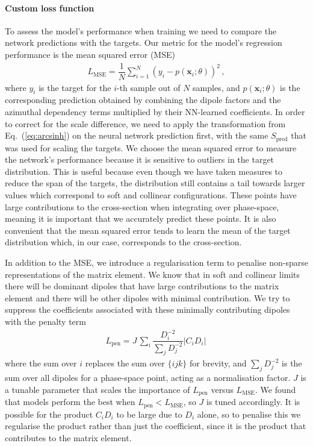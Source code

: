 \documentclass[main.tex]{subfiles}
\begin{document}
\paragraph*{Custom loss function}
To assess the model's performance when training we need to compare the network predictions with the targets. Our metric for the model's regression performance is the mean squared error (MSE)
\begin{eqnarray}\label{eq:mse}
    L_{\mathrm{MSE}} = \dfrac{1}{N} \sum_{i=1}^{N} \left(y_{i} - p(\mathbf{x}_{i}; \theta)\right)^{2} \, ,
\end{eqnarray}
where $y_{i}$ is the target for the $i$-th sample out of $N$ samples, and $p(\mathbf{x}_{i}; \theta)$ is the corresponding prediction
obtained by combining the dipole factors and the azimuthal dependency terms multiplied by their NN-learned coefficients. 
In order to correct for the scale difference, we need to apply the transformation from Eq.~(\ref{eq:arcsinh}) on the neural network prediction first, with the same $S_{\mathrm{pred}}$ that was used for scaling the targets.
We choose the mean squared error to measure the network's performance because it is sensitive to outliers in the target distribution.
This is useful because even though we have taken measures to reduce the span of the targets, the distribution still contains a tail towards larger values which correspond to soft and collinear configurations.
These points have large contributions to the cross-section when integrating over phase-space, meaning it is important that we accurately predict these points.
It is also convenient that the mean squared error tends to learn the mean of the target distribution which, in our case, corresponds to the cross-section.

In addition to the MSE, we introduce a regularisation term to penalise non-sparse representations of the matrix element. We know that in soft and collinear limits there will be dominant dipoles that have large contributions to the matrix element and there will be other dipoles with minimal contribution. We try to suppress the coefficients associated with these minimally contributing dipoles with the penalty term
\begin{eqnarray}\label{eq:penalty}
    L_{\mathrm{pen}} = J \, \sum_{i} \dfrac{D_{i}^{-2}}{\sum_{j}D_{j}^{-2}} |C_{i}D_{i}| \,
\end{eqnarray}
where the sum over $i$ replaces the sum over $\{ijk\}$ for brevity, and $\sum_{j} D_{j}^{-2}$ is the sum over all dipoles for a phase-space point, acting as a normalisation factor.
$J$ is a tunable parameter that scales the importance of $L_{\mathrm{pen}}$ versus $L_{\mathrm{MSE}}$.
We found that models perform the best when $L_{\mathrm{pen}} < L_{\mathrm{MSE}}$, so $J$ is tuned accordingly.
It is possible for the product $C_{i}D_{i}$ to be large due to $D_{i}$ alone, so to penalise this we regularise the product rather than just the coefficient, since it is the product that contributes to the matrix element.
\end{document}
